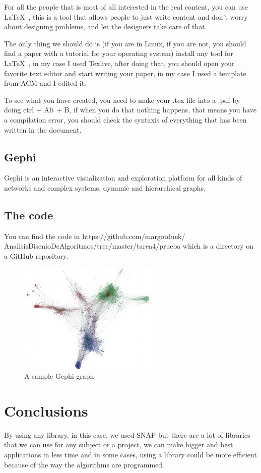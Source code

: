 \documentclass{sig-alternate-05-2015}
\begin{document}
For all the people that is most of all interested in the real
content, you can use \LaTeX\ , this is a tool that allows people
to just write content and don't worry about designing problems,
and let the designers take care of that.

The only thing we should do is (if you are in Linux, if you are not,
you should find a paper with a tutorial for your operating system)
install any tool for \LaTeX\ , in my case I used Texlive, after
doing that, you should open your favorite text editor and start
writing your paper, in my case I used a template from ACM
and I edited it.

To see what you have created, you need to make your .tex file into a
.pdf by doing ctrl + Alt + B, if when you do that nothing happens,
that means you have a compilation error, you should check the syntaxis
of everything that has been written in the document.


\subsection{Gephi}
Gephi is an interactive visualization and exploration platform
for all kinds of networks and complex systems,
dynamic and hierarchical graphs.

\subsection{The code}
You can find the code in https://github.com/margotduek/
AnalisisDisenioDeAlgoritmos/tree/master/tarea4/prueba   
which is a directory on a GitHub repository.

\begin{figure}
\centering
\includegraphics{gephi}
\caption{A sample Gephi graph}
\end{figure}

\section{Conclusions}
By using any library, in this case, we used SNAP but there
are a lot of libraries that we can use for any subject or
a project, we can make bigger and best applications in less time
and in some cases, using a library could be more efficient
because of the way the algorithms are programmed.
\end{document}
